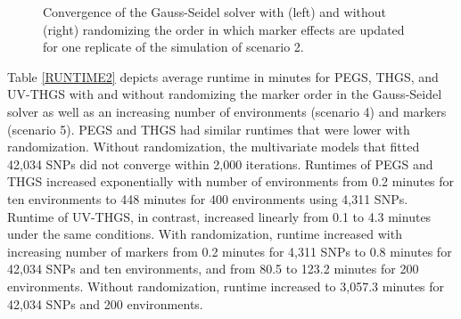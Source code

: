 \documentclass{bmcart}
\def\texttt{[image: ]}
\begin{document}
\begin{figure}[ht]
  \caption{\small{Convergence of the Gauss-Seidel solver with (left) and without (right) randomizing the order in which marker effects are updated for one replicate of the simulation of scenario 2.}}
  \label{convergence}
\end{figure}

Table \ref{RUNTIME2} depicts average runtime in minutes for PEGS, THGS, and UV-THGS with and without randomizing the marker order in the Gauss-Seidel solver as well as an increasing number of environments (scenario 4) and markers (scenario 5). PEGS and THGS had similar runtimes that were lower with randomization. Without randomization, the multivariate models that fitted 42,034 SNPs did not converge within 2,000 iterations.
Runtimes of PEGS and THGS increased exponentially with number of environments from 0.2 minutes for ten environments to 448 minutes for 400 environments using 4,311 SNPs. Runtime of UV-THGS, in contrast, increased linearly from 0.1 to 4.3 minutes under the same conditions. With randomization, runtime increased with increasing number of markers from 0.2 minutes for 4,311 SNPs to 0.8 minutes for 42,034 SNPs and ten environments, and from 80.5 to 123.2 minutes for 200 environments. Without randomization, runtime increased to 3,057.3 minutes for 42,034 SNPs and 200 environments.
\end{document}
